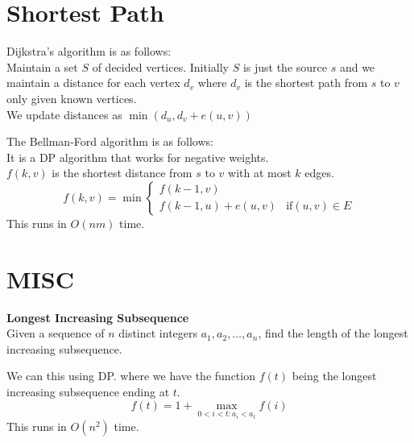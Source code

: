 \documentclass[answers,12pt,addpoints]{exam}
\begin{document}
\begin{questions}
\section{Shortest Path}
\begin{definition}
    Dijkstra's algorithm is as follows:\\
    Maintain a set $S$ of decided vertices. Initially $S$ is just the source $s$ and we maintain a distance for each vertex $d_v$ where $d_v$ is the shortest path from $s$ to $v$ only given known vertices.\\
    We update distances as $\min(d_u, d_v + e(u,v))$ 
\end{definition}
\begin{definition}
    The Bellman-Ford algorithm is as follows:\\
    It is a DP algorithm that works for negative weights.\\
    $f(k,v)$ is the shortest distance from $s$ to $v$ with at most $k$ edges.\\
    $$f(k,v) = \min \begin{cases}
        f(k-1,v) \\
        f(k-1,u) + e(u,v) & \text{if} (u,v) \in E
    \end{cases}$$
    This runs in $O(nm)$ time.
\end{definition}
\begin{definition}
    
    
\end{definition}

\section{MISC}
\question\textbf{Longest Increasing Subsequence}\\
Given a sequence of $n$ distinct integers $a_1, a_2, \dots, a_n$, find the length of the longest increasing subsequence.
\begin{solution}
    We can this using DP. where we have the function $f(t)$ being the longest increasing subsequence ending at $t$.
    $$ f(t)  = 1 + \max_{0 < i < t: a_i < a_t} f(i)$$
    This runs in $O(n^2)$ time.
\end{solution}


\newpage

\end{questions}
\end{document}
